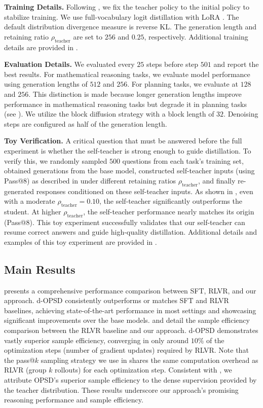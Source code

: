 \documentclass{llmxive}
\begin{document}
\textbf{Training Details. } Following \citep{zhao2026self}, we fix the teacher policy to the initial policy to stabilize training. We use full-vocabulary logit distillation with LoRA \citep{hu2022lora}. The default distribution divergence measure is reverse KL. The generation length and retaining ratio $\rho_\text{teacher}$ are set to $256$ and $0.25$, respectively. Additional training details are provided in .

\textbf{Evaluation Details. } We evaluated every $25$ steps before step $501$ and report the best results. For mathematical reasoning tasks, we evaluate model performance using generation lengths of $512$ and $256$. For planning tasks, we evaluate at $128$ and $256$. This distinction is made because longer generation lengths improve performance in mathematical reasoning tasks but degrade it in planning tasks (see ). We utilize the block diffusion strategy \citep{arriola2025block} with a block length of $32$. Denoising steps are configured as half of the generation length. 

\textbf{Toy Verification. } A critical question that must be answered before the full experiment is whether the self-teacher is strong enough to guide distillation. To verify this, we randomly sampled $500$ questions from each task's training set, obtained generations from the base model, constructed self-teacher inputs (using Pass@$8$) as described in  under different retaining ratios $\rho_\text{teacher}$, and finally re-generated responses conditioned on these self-teacher inputs. As shown in , even with a moderate $\rho_\text{teacher} = 0.10$, the self-teacher significantly outperforms the student. At higher $\rho_\text{teacher}$, the self-teacher performance nearly matches its origin (Pass@8). This toy experiment successfully validates that our self-teacher can resume correct answers and guide high-quality distillation. Additional details and examples of this toy experiment are provided in .  

\subsection{Main Results} \label{sec4.2}


 presents a comprehensive performance comparison between SFT, RLVR, and our approach. d-OPSD consistently outperforms or matches SFT and RLVR baselines, achieving state-of-the-art performance in most settings and showcasing significant improvements over the base models.  and  detail the sample efficiency comparison between the RLVR baseline and our approach. d-OPSD demonstrates vastly superior sample efficiency, converging in only around $10\%$ of the optimization steps (number of gradient updates) required by RLVR. Note that the pass@$k$ sampling strategy we use in  shares the same computation overhead as RLVR (group $k$ rollouts) for each optimization step. Consistent with \citep{lu2025onpolicydistillation, zhao2026self}, we attribute OPSD’s superior sample efficiency to the dense supervision provided by the teacher distribution. These results underscore our approach's promising reasoning performance and sample efficiency.
\end{document}
